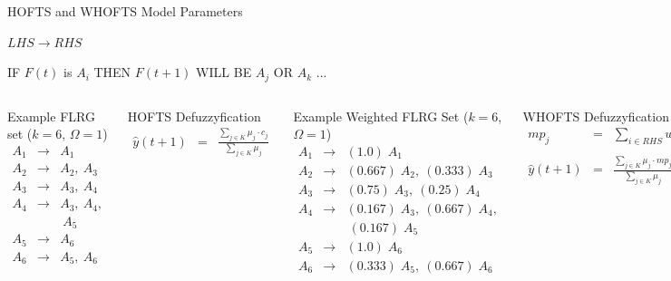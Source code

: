 \documentclass{beamer}
\begin{document}
\begin{frame}{HOFTS and WHOFTS Model Parameters}
\scriptsize
\begin{center}
$LHS \rightarrow RHS$

IF $F(t)$ is $A_i$ THEN $F(t+1)$ WILL BE $A_j$ OR $A_k$ ...    
\end{center}

\begin{columns}
\begin{block}{Example FLRG set ($k=6$, $\Omega=1$)}
$$
\begin{array}{rcl}
A_1  & \rightarrow &  A_1 \\
A_2  & \rightarrow &  A_2,\  A_3 \\
A_3  & \rightarrow &  A_3,\  A_4 \\
A_4  & \rightarrow &  A_3,\  A_4,\\
& & \  A_5 \\
A_5  & \rightarrow &  A_6 \\
A_6  & \rightarrow &  A_5,\  A_6 \\
\end{array}
$$
\end{block}
\begin{block}{HOFTS Defuzzyfication}
$$
\begin{array}{rcl}
     \hat{y}(t+1) & = & \frac{\sum_{j \in K} \mu_j\cdot c_j}{\sum_{j \in K} \mu_j}
\end{array}
$$
\end{block}
\begin{block}{Example Weighted FLRG Set ($k=6$, $\Omega=1$)}
$$
\begin{array}{rcl}
A_1  & \rightarrow &  (1.0)\; A_1 \\
A_2  & \rightarrow &  (0.667)\; A_2,\  (0.333)\; A_3 \\
A_3  & \rightarrow &  (0.75)\; A_3,\  (0.25)\; A_4 \\
A_4  & \rightarrow &  (0.167)\; A_3,\  (0.667)\; A_4,\\
& & \  (0.167)\; A_5 \\
A_5  & \rightarrow &  (1.0)\; A_6 \\
A_6  & \rightarrow &  (0.333)\; A_5,\  (0.667)\; A_6 \\
\end{array}
$$
\end{block}
\begin{block}{WHOFTS Defuzzyfication}
$$
\begin{array}{rcl}
     mp_j & = & \sum_{i \in RHS} w_i \cdot c_i  \\
     \\
     \hat{y}(t+1) & = & \frac{\sum_{j \in K} \mu_j \cdot mp_j}{\sum_{j \in K} \mu_j}
\end{array}
$$
\end{block}
\end{columns}
\end{frame}
\end{document}
